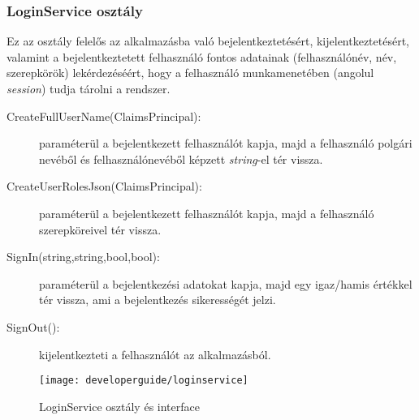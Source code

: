 \subsubsection{LoginService osztály}
Ez az osztály felelős az alkalmazásba való bejelentkeztetésért, kijelentkeztetésért, valamint a bejelentkeztetett felhasználó fontos adatainak (felhasználónév, név, szerepkörök) lekérdezéséért, hogy a felhasználó munkamenetében (angolul \emph{session}) tudja tárolni a rendszer.
\begin{description}
	\item[CreateFullUserName(ClaimsPrincipal):] paraméterül a bejelentkezett felhasználót kapja, majd a felhasználó polgári nevéből és felhasználónevéből képzett \emph{string}-el tér vissza.
	\item[CreateUserRolesJson(ClaimsPrincipal):] paraméterül a bejelentkezett felhasználót kapja, majd a felhasználó szerepköreivel tér vissza.
	\item[SignIn(string,string,bool,bool):] paraméterül a bejelentkezési adatokat kapja, majd egy igaz/hamis értékkel tér vissza, ami a bejelentkezés sikerességét jelzi.
	\item[SignOut():] kijelentkezteti a felhasználót az alkalmazásból.
\end{description}
\begin{figure}[H]
	\centering
	\texttt{[image: developerguide/loginservice]}
	\caption{LoginService osztály és interface}
	\label{fig:bll-loginservice}
\end{figure}
